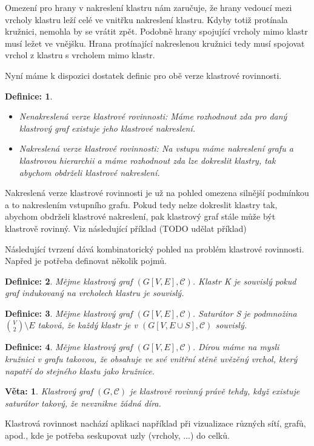 \documentclass[12pt,a4report]{report}
\newtheorem{defn}{Definice: }[chapter]
\newtheorem{theorem}{Věta: }[chapter]
\begin{document}
Omezení pro hrany v nakreslení klastru nám zaručuje, že hrany vedoucí mezi vrcholy klastru leží celé ve vnitřku nakreslení klastru. Kdyby totiž protínala kružnici, nemohla by se vrátit zpět. Podobně hrany spojující vrcholy mimo klastr musí ležet ve vnějšku. Hrana protínající nakreslenou kružnici tedy musí spojovat vrchol z klastru s vrcholem mimo klastr.

Nyní máme k dispozici dostatek definic pro obě verze klastrové rovinnosti.

\begin{defn}
\begin{itemize}
\item Nenakreslená verze klastrové rovinnosti: Máme rozhodnout zda pro daný klastrový graf existuje jeho klastrové nakreslení.
\item Nakreslená verze klastrové rovinnosti: Na vstupu máme nakreslení grafu a klastrovou hierarchii a máme rozhodnout zda lze dokreslit klastry, tak abychom obdrželi klastrové nakreslení.
\end{itemize}
\end{defn}

Nakreslená verze klastrové rovinnosti je už na pohled omezena silnější podmínkou a to nakreslením vstupního grafu. Pokud tedy nelze dokreslit klastry tak, abychom obdrželi klastrové nakreslení, pak klastrový graf stále může být klastrově rovinný. Viz následující příklad (TODO udělat příklad)

Následující tvrzení dává kombinatorický pohled na problém klastrové rovinnosti. Napřed je potřeba definovat několik pojmů.
\begin{defn}
Mějme klastrový graf $(G[V,E],\mathcal C)$. Klastr K je souvislý pokud graf indukovaný na vrcholech klastru je souvislý. 
\end{defn}

\begin{defn}
Mějme klastrový graf $(G[V,E],\mathcal C)$. Saturátor S je podmnožina ${V \choose 2} \setminus E$ taková, že každý klastr je v  $(G[V,E \cup S],\mathcal C)$ souvislý.
\end{defn}

\begin{defn}
Mějme klastrový graf $(G[V,E],\mathcal C)$. Dírou máme na mysli kružnici v grafu takovou, že obsahuje ve své vnitřní stěně uvězěný vrchol, který napatří do stejného klastu jako kružnice.
\end{defn}

\begin{theorem}
Klastrový graf $(G,\mathcal C)$ je klastrově rovinný právě tehdy, když existuje saturátor takový, že nevznikne žádná díra.
\end{theorem}

Klastrová rovinnost nachází aplikaci například při vizualizace různých sítí, grafů, apod., kde je potřeba seskupovat uzly (vrcholy, ...) do celků.
\end{document}
